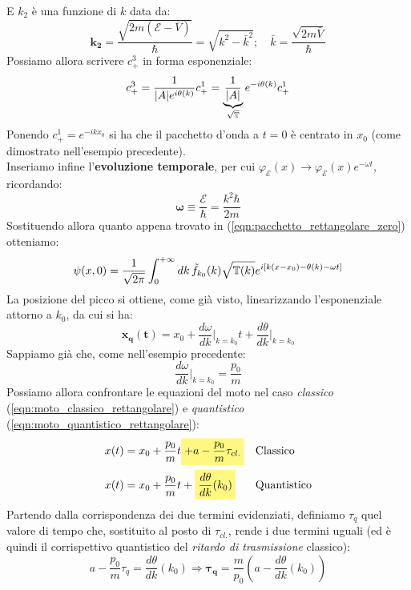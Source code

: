 \documentclass[../../FisicaTeorica.tex]{subfiles}
\begin{document}
E $k_2$ è una funzione di $k$ data da:
\begin{equation}
\bm{k_2} = \frac{\sqrt{2m(\mathcal{E}-\bar{V})}}{\hbar}=\sqrt{k^2-\bar{k}^2}; \quad \bar{k}=\frac{\sqrt{2m\bar{V}}}{\hbar}
\label{eqn:k2function}
\end{equation}
Possiamo allora scrivere $c^3_+$ in forma esponenziale:
\[
c^3_+ = \frac{1}{|A|e^{i\theta(k)}}c^1_+=\underbrace{\frac{1}{|A|}}_{\sqrt{\mathbb{T}}}e^{-i\theta(k)}c^1_+
\]
Ponendo $c^1_+ = e^{-ikx_0}$ si ha che il pacchetto d'onda a $t=0$ è centrato in $x_0$ (come dimostrato nell'esempio precedente).\\ %
Inseriamo infine l'\textbf{evoluzione temporale}, per cui $\varphi_\mathcal{E}(x)\to \varphi_\mathcal{E}(x) e^{-\omega t}$, ricordando:
\[
\bm{\omega} \equiv \frac{\mathcal{E}}{\hbar}=\frac{k^2 \hbar}{2m}
\]
Sostituendo allora quanto appena trovato in (\ref{eqn:pacchetto_rettangolare_zero}) otteniamo:
\[
\psi(x,0)=\frac{1}{\sqrt{2\pi}}\int_0^{+\infty} dk\,\tilde{f}_{k_0}(k) \sqrt{\mathbb{T}(k)} e^{i[k(x-x_0)-\theta(k)-\omega t]}
\]
La posizione del picco si ottiene, come già visto, linearizzando l'esponenziale attorno a $k_0$, da cui si ha:
\begin{equation}
\bm{x_q(t)} = x_0+ \frac{d\omega}{dk}\Big|_{k=k_0} t + {\frac{d\theta}{dk}\Big|_{k=k_0}}
\label{eqn:moto_quantistico_rettangolare}
\end{equation}
Sappiamo già che, come nell'esempio precedente:
\[
\frac{d\omega}{dk}\Big|_{k=k_0}=\frac{p_0}{m}
\]
Possiamo allora confrontare le equazioni del moto nel caso \textit{classico} (\ref{eqn:moto_classico_rettangolare}) e \textit{quantistico} (\ref{eqn:moto_quantistico_rettangolare}):
\begin{align*}
x(t)&= x_0 + \frac{p_0}{m}t \hlc{Yellow}{+ a - \frac{p_0}{m}\tau_{cl.}} &&\text{Classico}\\
x(t)&=x_0+\frac{p_0}{m}t+\hlc{Yellow}{\frac{d\theta}{dk}(k_0)} && \text{Quantistico}
\end{align*}
Partendo dalla corrispondenza dei due termini evidenziati, definiamo $\tau_q$ quel valore di tempo che, sostituito al posto di $\tau_{cl.}$, rende i due termini uguali (ed è quindi il corrispettivo quantistico del \textit{ritardo di trasmissione} classico):
\begin{equation}
a-\frac{p_0}{m}\tau_q =\frac{d\theta}{dk}(k_0) \Rightarrow
\bm{\tau_q}=\frac{m}{p_0}\left(a-\frac{d\theta}{dk}(k_0)\right)
\label{eqn:ritardo_trasmissione_quantistico}
\end{equation}
\end{document}
